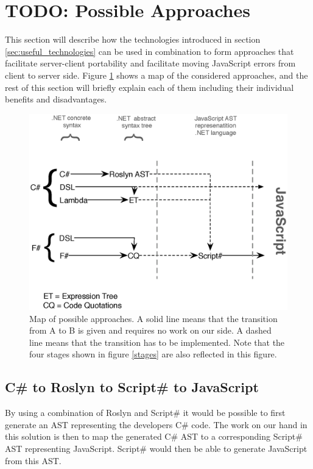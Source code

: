 \section{TODO: Possible Approaches} %
\label{sec:possible_approaches}
	This section will describe how the technologies introduced in section \ref{sec:useful_technologies} can be used in combination to form approaches that facilitate server-client portability and facilitate moving JavaScript errors from client to server side. Figure \ref{approachMap} shows a map of the considered approaches, and the rest of this section will briefly explain each of them including their individual benefits and disadvantages. 

	\begin{figure}[H]
		\begin{center}
			\centerline{\includegraphics[width=14cm]{resources/images/approachComparison.eps}}
		\end{center}
		\caption{Map of possible approaches. A solid line means that the transition from A to B is given and requires no work on our side. A dashed line means that the transition has to be implemented. Note that the four stages shown in figure \ref{stages} are also reflected in this figure.}
		\label{approachMap}
	\end{figure}

		
	\subsection{C\# to Roslyn to Script\# to JavaScript} %
	\label{ssub:c_to_roslyn_to_script_to_javascript}
		By using a combination of Roslyn and Script\# it would be possible to first generate an AST representing the developers C\# code. The work on our hand in this solution is then to map the generated C\# AST to a corresponding Script\# AST representing JavaScript. Script\# would then be able to generate JavaScript from this AST.

